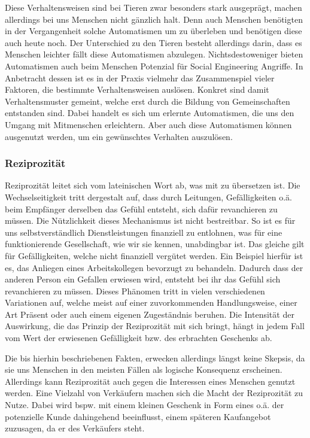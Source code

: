 Diese Verhaltensweisen sind bei Tieren zwar besonders stark ausgeprägt, machen allerdings bei uns Menschen nicht gänzlich halt.
Denn auch Menschen benötigten in der Vergangenheit solche Automatismen um zu überleben und benötigen diese auch heute noch.
Der Unterschied zu den Tieren besteht allerdings darin, dass es Menschen leichter fällt diese Automatismen abzulegen.
Nichtsdestoweniger bieten Automatismen auch beim Menschen Potenzial für Social Engineering Angriffe.
In Anbetracht dessen ist es in der Praxis vielmehr das Zusammenspiel vieler Faktoren, die bestimmte Verhaltensweisen auslösen. Konkret sind damit Verhaltensmuster gemeint, welche erst durch die Bildung von Gemeinschaften entstanden sind. Dabei handelt es sich um erlernte Automatismen, die uns den Umgang mit Mitmenschen erleichtern. Aber auch diese Automatismen können ausgenutzt werden, um ein gewünschtes Verhalten auszulösen. \citep{cialdini}


\subsubsection{Reziprozität}\label{sec:reziprozität}
Reziprozität leitet sich vom lateinischen Wort  ab, was mit  zu übersetzen ist.
Die Wechselseitigkeit tritt dergestalt auf, dass durch Leitungen, Gefälligkeiten o.ä. beim Empfänger derselben das Gefühl entsteht, sich dafür revanchieren zu müssen.
Die Nützlichkeit dieses Mechanismus ist nicht bestreitbar.
So ist es für uns selbstverständlich Dienstleistungen finanziell zu entlohnen, was für eine funktionierende Gesellschaft, wie wir sie kennen, unabdingbar ist.
Das gleiche gilt für Gefälligkeiten, welche nicht finanziell vergütet werden. Ein Beispiel hierfür ist es, das Anliegen eines Arbeitskollegen bevorzugt zu behandeln. Dadurch dass der anderen Person ein Gefallen erwiesen wird, entsteht bei ihr das Gefühl sich revanchieren zu müssen.
Dieses Phänomen tritt in vielen verschiedenen Variationen auf, welche meist auf einer zuvorkommenden Handlungsweise, einer Art Präsent oder auch einem eigenen Zugeständnis beruhen. Die Intensität der Auswirkung, die das Prinzip der Reziprozität mit sich bringt, hängt in jedem Fall vom Wert der erwiesenen Gefälligkeit bzw. des erbrachten Geschenks ab.

Die bis hierhin beschriebenen Fakten, erwecken allerdings längst keine Skepsis, da sie uns Menschen in den meisten Fällen als logische Konsequenz erscheinen. Allerdings kann Reziprozität auch gegen die Interessen eines Menschen genutzt werden. Eine Vielzahl von Verkäufern machen sich die Macht der Reziprozität zu Nutze. 
Dabei wird bspw. mit einem kleinen Geschenk in Form eines  o.ä. der potenzielle Kunde dahingehend beeinflusst, einem späteren Kaufangebot zuzusagen, da er  des Verkäufers steht. \citep{cialdini}

